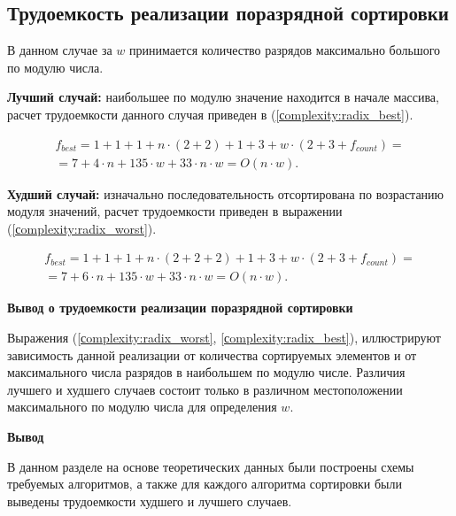 \subsection{Трудоемкость реализации поразрядной сортировки}
В данном случае за $w$ принимается количество разрядов максимально большого по модулю числа.

\textbf{Лучший случай:} наибольшее по модулю значение находится в начале массива, расчет трудоемкости данного случая приведен в (\ref{сomplexity:radix_best}).


\begin{equation}
	\label{сomplexity:radix_best}
	\begin{gathered}
		f_{best} = 1 + 1 + 1 + n \cdot (2 + 2) + 1 +3 + w \cdot (2 + 3 + f_{count}) = \\
		= 7 + 4 \cdot n + 135 \cdot w + 33 \cdot n \cdot w = O(n \cdot w).
	\end{gathered}
\end{equation}


\textbf{Худший случай:} изначально последовательность отсортирована по возрастанию модуля значений, расчет трудоемкости приведен в выражении (\ref{сomplexity:radix_worst}).

\begin{equation}
	\label{сomplexity:radix_worst}
	\begin{gathered}
		f_{best} = 1 + 1 + 1 + n \cdot (2 + 2 + 2) + 1 +3 + w \cdot (2 + 3 + f_{count}) = \\
		= 7 + 6 \cdot n + 135 \cdot w + 33 \cdot n \cdot w = O(n \cdot w).
	\end{gathered}
\end{equation}

\textbf{Вывод о  трудоемкости  реализации поразрядной сортировки}

Выражения (\ref{сomplexity:radix_worst}, \ref{сomplexity:radix_best}), иллюстрируют зависимость данной реализации от количества сортируемых элементов и от максимального числа разрядов в наибольшем по модулю числе. Различия лучшего и худшего случаев состоит только в различном местоположении максимального по модулю числа для определения $w$.




\textbf{Вывод}

В данном разделе на основе теоретических данных были построены схемы
требуемых алгоритмов, а также для каждого алгоритма сортировки были выведены трудоемкости худшего и лучшего случаев.









